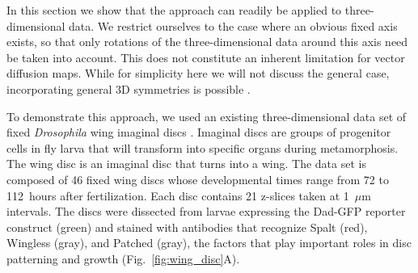 \documentclass[twocolumn, 10pt]{article}
\newcommand{\fig}[0]{Fig.}
\begin{document}
In this section we show that the approach can readily be applied to three-dimensional data. 
%
We restrict ourselves to the case where an obvious fixed axis exists, so that only rotations of the three-dimensional data around this axis need be taken into account.  
%
This does not constitute an inherent limitation for vector diffusion maps. 
%
While for simplicity here we will not discuss the general  case, incorporating general 3D symmetries is possible \citep{arie2012global, wang2013exact, cucuringu2012eigenvector}. 

%
%

To demonstrate this approach, we used an existing three-dimensional data set of fixed {\em Drosophila} wing imaginal discs \citep{hamaratoglu2011dpp}.
%
Imaginal discs are groups of progenitor cells in fly larva that will transform into specific organs during metamorphosis.
%
The wing disc is an imaginal disc that turns into a wing.
%
The data set is composed of 46 fixed wing discs whose developmental times range from 72 to 112~hours after fertilization.
%
Each disc contains 21 z-slices taken at 1~$\mu$m intervals.
%
The discs were dissected from larvae expressing the Dad-GFP reporter construct (green) and stained with antibodies that recognize Spalt (red), Wingless (gray), and Patched (gray), the factors that play important roles in disc patterning and growth (\fig~\ref{fig:wing_disc}A).
%
\end{document}

